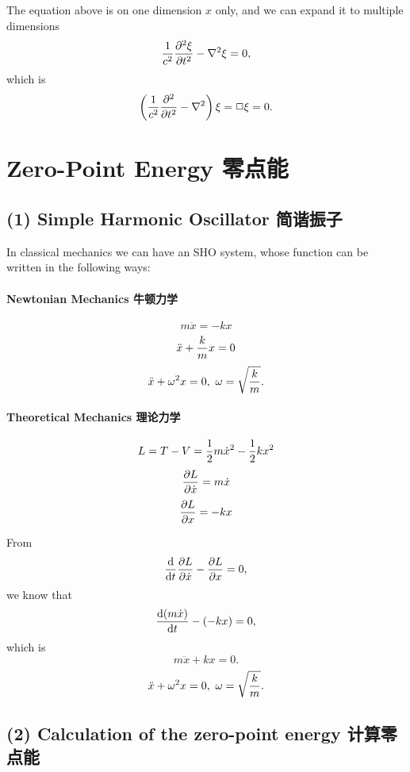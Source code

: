 The equation above is on one dimension \(x\) only, and we can expand it to multiple dimensions \[{1 \over c^2} {\partial^2 \xi \over \partial t^2 } - \nabla ^2 \xi = 0,\] which is \[\left ( {1 \over c^2} {\partial^2 \over \partial t^2 } - \nabla ^2 \right ) \xi = \Box \xi = 0.\]

\section{Zero-Point Energy 零点能}\label{zero-point-energy-ux96f6ux70b9ux80fd}

\subsection*{(1) Simple Harmonic Oscillator 简谐振子}\label{simple-harmonic-oscillator-ux7b80ux8c10ux632fux5b50-1}

In classical mechanics we can have an SHO system, whose function can be written in the following ways:

\paragraph{Newtonian Mechanics 牛顿力学}\label{newtonian-mechanics-ux725bux987fux529bux5b66}

\[m \ddot x = -kx\] \[\ddot x + {k \over m } x =0 \] \[\ddot x + \omega^2 x =0, \ \omega=\sqrt{k \over m }.\]

\paragraph{Theoretical Mechanics 理论力学}\label{theoretical-mechanics-ux7406ux8bbaux529bux5b66}

\[L=T-V = {1 \over 2}m \dot x^2-{1 \over 2}k x^2\] \[{\partial L \over \partial \dot x} = m \dot x\] \[{\partial L \over \partial x} = -kx\]

From \[{\mathrm d \over \mathrm dt} {\partial L \over \partial \dot x}- {\partial L \over \partial x}=0,\] we know that \[{\mathrm d(m \dot x) \over \mathrm dt} - (-kx)=0, \] which is \[m \ddot x +kx = 0.\] \[\ddot x + \omega^2 x =0, \ \omega=\sqrt{k \over m }.\]

\subsection*{(2) Calculation of the zero-point energy 计算零点能}\label{calculation-of-the-zero-point-energy-ux8ba1ux7b97ux96f6ux70b9ux80fd}

